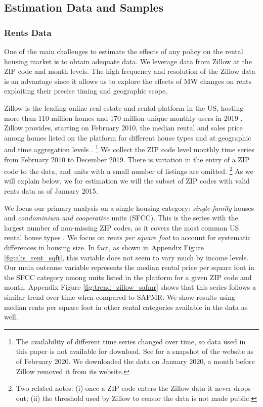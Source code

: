 \subsection{Estimation Data and Samples}

\subsubsection{Rents Data}
\label{sec:data_rents}

One of the main challenges to estimate the effects of any policy on the rental
housing market is to obtain adequate data.
We leverage data from Zillow at the ZIP code and month levels.
The high frequency and resolution of the Zillow data is an advantage since it 
allows us to explore the effects of MW changes on rents exploiting their precise
timing and geographic scope. 

Zillow is the leading online real estate and rental platform in the US, hosting
more than 110 million homes and 170 million unique monthly users in 2019 
\parencite{ZillowFacts}.
Zillow provides, starting on February 2010, the median rental and sales price 
among homes listed on the platform for different house types and at geographic
and time aggregation levels \parencite{ZillowData}.%
\footnote{The availability of different time series changed over time, so
data used in this paper is not available for download.
See \textcite{ZillowDataArchive} for a snapshot of the website as of 
February 2020.
We downloaded the data on January 2020, a month before Zillow removed it from
its website.} 
We collect the ZIP code level monthly time series from February 2010 to 
December 2019. 
There is variation in the entry of a ZIP code to the data, and units with a small 
number of listings are omitted.%
\footnote{Two related notes:
(i) once a ZIP code enters the Zillow data it never drops out;
(ii) the threshold used by Zillow to censor the data is not made public.}
As we will explain below, we for estimation we will the subset of ZIP codes
with valid rents data as of January 2015.

We focus our primary analysis on a single housing category:
\textit{single-family} houses and \textit{condominium and cooperative} units (SFCC).
This is the series with the largest number of non-missing ZIP codes, as it 
covers the most common US rental house types \parencite{Fernald2020}.
We focus on rents \textit{per square foot} to account for systematic differences
in housing size.
In fact, as shown in Appendix Figure \ref{fig:ahs_rent_sqft}, this variable does 
not seem to vary much by income levels.
Our main outcome variable represents the median rental price per square foot in 
the SFCC category among units listed in the platform for a given ZIP code and 
month.
Appendix Figure \ref{fig:trend_zillow_safmr} shows that this series follows a 
similar trend over time when compared to SAFMR.
We show results using median rents per square foot in other rental categories 
available in the data as well.

